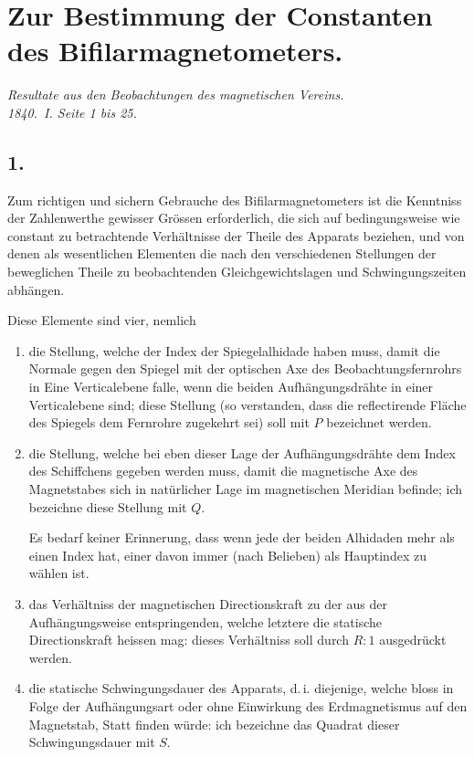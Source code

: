 \documentclass[12pt,a4paper]{article}
\begin{document}
\newpage
\section*{Zur Bestimmung der Constanten des Bifilarmagnetometers.}

\begin{center}
\textit{Resultate aus den Beobachtungen des magnetischen Vereins.}\\
\textit{1840.~I. Seite 1 bis 25.}
\end{center}

\subsection*{1.}

Zum richtigen und sichern Gebrauche des Bifilarmagnetometers ist die Kenntniss der Zahlenwerthe gewisser Grössen erforderlich, die sich auf bedingungsweise wie constant zu betrachtende Verhältnisse der Theile des Apparats beziehen, und von denen als wesentlichen Elementen die nach den verschiedenen Stellungen der beweglichen Theile zu beobachtenden Gleichgewichtslagen und Schwingungszeiten abhängen.

Diese Elemente sind vier, nemlich
\begin{enumerate}[label=\arabic*)]
\item die Stellung, welche der Index der Spiegelalhidade haben muss, damit die Normale gegen den Spiegel mit der optischen Axe des Beobachtungsfernrohrs in Eine Verticalebene falle, wenn die beiden Aufhängungsdrähte in einer Verticalebene sind; diese Stellung (so verstanden, dass die reflectirende Fläche des Spiegels dem Fernrohre zugekehrt sei) soll mit $P$ bezeichnet werden.

\item die Stellung, welche bei eben dieser Lage der Aufhängungsdrähte dem Index des Schiffchens gegeben werden muss, damit die magnetische Axe des Magnetstabes sich in natürlicher Lage im magnetischen Meridian befinde; ich bezeichne diese Stellung mit $Q$.

Es bedarf keiner Erinnerung, dass wenn jede der beiden Alhidaden mehr als einen Index hat, einer davon immer (nach Belieben) als Hauptindex zu wählen ist.

\item das Verhältniss der magnetischen Directionskraft zu der aus der Aufhängungsweise entspringenden, welche letztere die statische Directionskraft heissen mag: dieses Verhältniss soll durch $R : 1$ ausgedrückt werden.

\item die statische Schwingungsdauer des Apparats, d.\,i. diejenige, welche bloss in Folge der Aufhängungsart oder ohne Einwirkung des Erdmagnetismus auf den Magnetstab, Statt finden würde: ich bezeichne das Quadrat dieser Schwingungsdauer mit $S$.
\end{enumerate}
\end{document}
